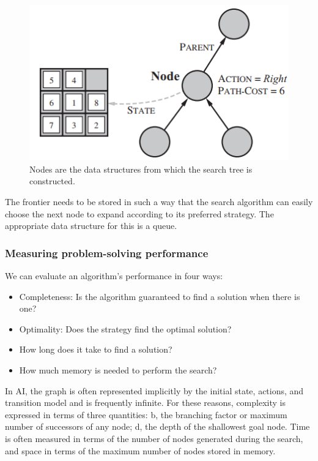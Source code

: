 \documentclass{article}
\begin{document}
\begin{figure}
     \center
     \includegraphics[scale = 1]{node_ds.png}
     \caption{Nodes are the data structures from which the search tree is constructed.}
     \label{fig:node_ds}
\end{figure}

The frontier needs to be stored in such a way that the search algorithm can easily choose the next node to expand according to its preferred strategy. The appropriate data structure for this is a queue.

\subsubsection{Measuring problem-solving performance}

We can evaluate an algorithm's performance in four ways:

\begin{itemize}
    \item Completeness: Is the algorithm guaranteed to find a solution when there is one?
    \item Optimality: Does the strategy find the optimal solution?
    \item How long does it take to find a solution?
    \item How much memory is needed to perform the search?
\end{itemize}

In AI, the graph is often represented implicitly by the initial state, actions, and transition model and is frequently infinite. For these reasons, complexity is expressed in terms of three quantities: b, the branching factor or maximum number of successors of any node; d, the depth of the shallowest goal node. Time is often measured in terms of the number of nodes generated during the search, and space in terms of the maximum number of nodes stored in memory.
\end{document}
